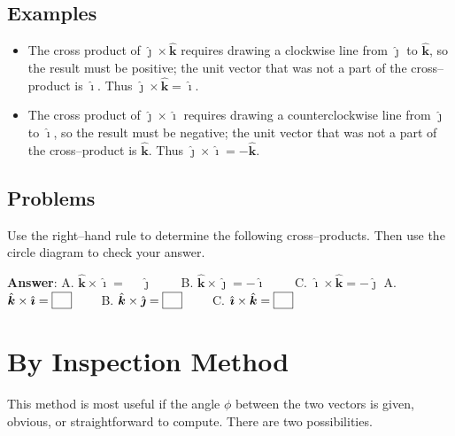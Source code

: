 \documentclass{article}
\newcommand{\ihat}[0]{\hat{\boldsymbol{\imath}}}
\newcommand{\jhat}[0]{\hat{\boldsymbol{\jmath}}}
\newcommand{\khat}[0]{\hat{\boldsymbol{k}}}
\begin{document}


\subsection{Examples}

\begin{itemize}

  \item The cross product of $\jhat \times \khat$ requires drawing a clockwise line from $\jhat$ to $\khat$, so the result must be positive; the unit vector that was not a part of the cross--product is $\ihat$. Thus $\jhat \times \khat = \ihat$.

  \item The cross product of $\jhat \times \ihat$ requires drawing a counterclockwise line from $\jhat$ to $\ihat$, so the result must be negative; the unit vector that was not a part of the cross--product is $\khat$. Thus $\jhat \times \ihat = -\khat$.

\end{itemize}

\subsection{Problems}

Use the right--hand rule to determine the following cross--products. Then use the circle diagram to check your answer.

\ifsolutions
\textbf{Answer}:
A. $\khat \times \ihat = \boxed{\phantom{-}\jhat}\qquad$
B. $\khat \times \jhat = \boxed{-\ihat}\qquad$
C. $\ihat \times \khat = \boxed{-\jhat}$
\else
A. $\khat \times \ihat = \fbox{\phantom M}\qquad$
B. $\khat \times \jhat = \fbox{\phantom M}\qquad$
C. $\ihat \times \khat = \fbox{\phantom M}$
\fi

\section{By Inspection Method}

This method is most useful if the angle $\phi$ between the two vectors is given, obvious, or straightforward to compute. There are two possibilities.
\end{document}
